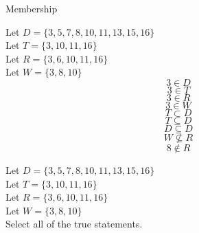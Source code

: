 \documentclass{ximera}
\begin{document}
\hfill\break
\hfill\break


\begin{example} Membership


Let $D = \{ 3, 5, 7, 8, 10, 11, 13, 15, 16 \}$  \\
Let $T = \{ 3, 10, 11, 16 \}$  \\
Let $R = \{ 3, 6, 10, 11, 16 \}$   \\
Let $W = \{ 3, 8, 10 \}$   \\


\[   3 \in D  \]
\[   3 \in T  \]
\[   3 \in R  \]
\[   3 \in W  \]
\[   T \subset D \]
\[   T \subseteq D \]
\[   D \subseteq D \]
\[   W \nsubseteq R \]
\[   8 \notin R  \]


\end{example}





\newpage


\begin{question}


Let $D = \{ 3, 5, 7, 8, 10, 11, 13, 15, 16 \}$  \\
Let $T = \{ 3, 10, 11, 16 \}$  \\
Let $R = \{ 3, 6, 10, 11, 16 \}$   \\
Let $W = \{ 3, 8, 10 \}$   \\


Select all of the true statements.

\begin{selectAll}
\end{selectAll}


\end{question}
\end{document}
